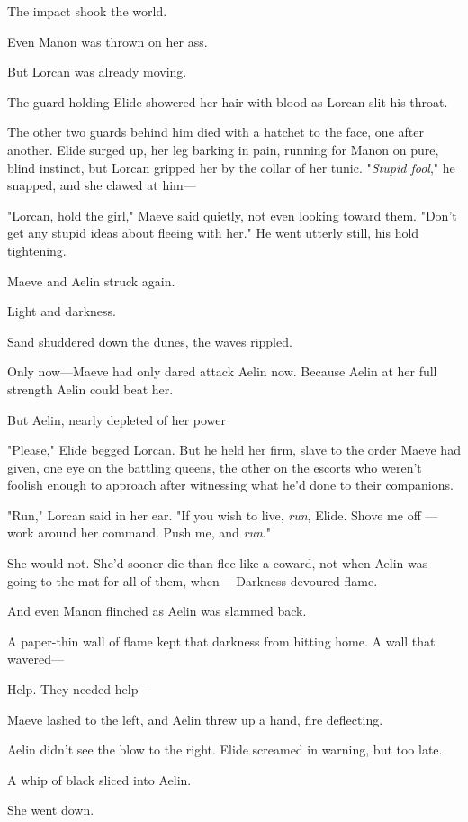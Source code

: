 The impact shook the world.

Even Manon was thrown on her ass.

But Lorcan was already moving.

The guard holding Elide showered her hair with blood as Lorcan slit his throat.

The other two guards behind him died with a hatchet to the face, one after another. Elide surged up, her leg barking in pain, running for Manon on pure, blind instinct, but Lorcan gripped her by the collar of her tunic. "\emph{Stupid fool}," he snapped, and she clawed at him---

"Lorcan, hold the girl," Maeve said quietly, not even looking toward them. "Don't get any stupid ideas about fleeing with her." He went utterly still, his hold tightening.

Maeve and Aelin struck again.

Light and darkness.

Sand shuddered down the dunes, the waves rippled.

Only now---Maeve had only dared attack Aelin now. Because Aelin at her full strength  Aelin could beat her.

But Aelin, nearly depleted of her power 

"Please," Elide begged Lorcan. But he held her firm, slave to the order Maeve had given, one eye on the battling queens, the other on the escorts who weren't foolish enough to approach after witnessing what he'd done to their companions.

"Run," Lorcan said in her ear. "If you wish to live, \emph{run}, Elide. Shove me off ---work around her command. Push me, and
\emph{run}."

She would not. She'd sooner die than flee like a coward, not when Aelin was going to the mat for all of them, when--- Darkness devoured flame.

And even Manon flinched as Aelin was slammed back.

A paper-thin wall of flame kept that darkness from hitting home. A wall that wavered---

Help. They needed help---

Maeve lashed to the left, and Aelin threw up a hand, fire deflecting.

Aelin didn't see the blow to the right. Elide screamed in warning, but too late.

A whip of black sliced into Aelin.

She went down.

